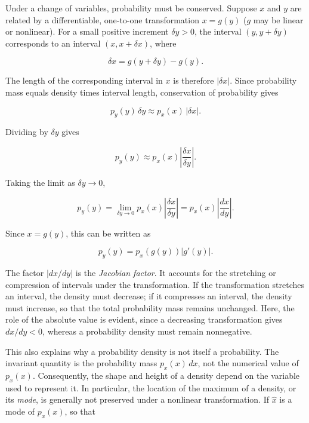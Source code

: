 \documentclass[10pt,twocolumn]{memoir}
\begin{document}
Under a change of variables, probability must be conserved. Suppose $x$ and $y$ are related by a differentiable, one-to-one transformation $x=g(y)$ ($g$ may be linear or nonlinear). For a small positive increment $\delta y>0$, the interval $(y,y+\delta y)$ corresponds to an interval $(x,x+\delta x)$, where

\begin{equation}
    \delta x = g(y+\delta y)-g(y).
\end{equation}

The length of the corresponding interval in $x$ is therefore $|\delta x|$. Since probability mass equals density times interval length, conservation of probability gives

\begin{equation}
    p_y(y)\,\delta y \approx p_x(x)\,|\delta x|.
\end{equation}

Dividing by $\delta y$ gives

\begin{equation}
    p_y(y) \approx p_x(x) \left|\frac{\delta x}{\delta y}\right|.
\end{equation}

Taking the limit as $\delta y \to 0$,

\begin{equation}
    p_y(y) = \lim_{\delta y \to 0} p_x(x) \left| \frac{\delta x}{\delta y} \right| = p_x(x) \left|\frac{dx}{dy}\right|.
\end{equation}

Since $x=g(y)$, this can be written as

\begin{equation}
    p_y(y) = p_x(g(y)) \left| g'(y) \right|.
\end{equation}

The factor $\left|dx/dy\right|$ is the \textit{Jacobian factor}. It accounts for the stretching or compression of intervals under the transformation. If the transformation stretches an interval, the density must decrease; if it compresses an interval, the density must increase, so that the total probability mass remains unchanged. Here, the role of the absolute value is evident, since a decreasing transformation gives $dx/dy<0$, whereas a probability density must remain nonnegative.

This also explains why a probability density is not itself a probability. The invariant quantity is the probability mass $p_x(x)\,dx$, not the numerical value of $p_x(x)$. Consequently, the shape and height of a density depend on the variable used to represent it. In particular, the location of the maximum of a density, or its \textit{mode}, is generally not preserved under a nonlinear transformation. If $\hat{x}$ is a mode of $p_x(x)$, so that
\end{document}
